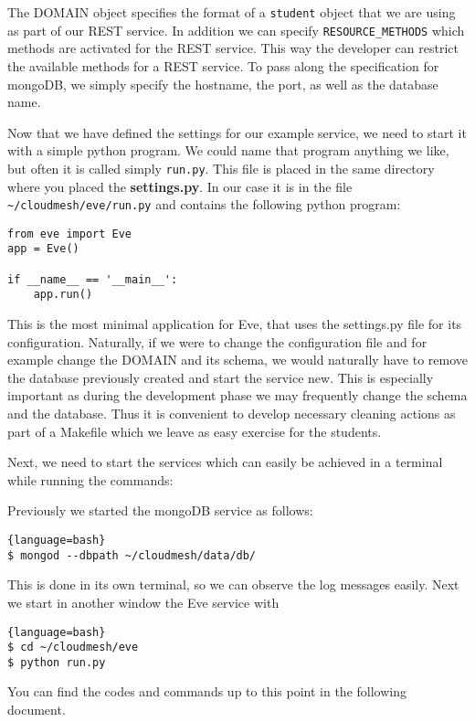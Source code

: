 The DOMAIN object specifies the format of a \verb|student| object that
we are using as part of our REST service.  In addition we can specify
\verb|RESOURCE_METHODS| which methods are activated for the REST
service. This way the developer can restrict the available methods for
a REST service. To pass along the specification for mongoDB, we simply
specify the hostname, the port, as well as the database name.

Now that we have defined the settings for our example service, we need
to start it with a simple python program. We could name that program
anything we like, but often it is called simply \verb|run.py|. This
file is placed in the same directory where you placed the
\textbf{settings.py}. In our case it is in the file
\verb|~/cloudmesh/eve/run.py| and contains the following python
program:

\begin{lstlisting}
from eve import Eve
app = Eve()

if __name__ == '__main__':
    app.run()
\end{lstlisting}

This is the most minimal application for Eve, that uses the
settings.py file for its configuration. Naturally, if we were to
change the configuration file and for example change the DOMAIN and
its schema, we would naturally have to remove the database previously
created and start the service new. This is especially important as
during the development phase we may frequently change the schema and
the database. Thus it is convenient to develop necessary cleaning
actions as part of a Makefile which we leave as easy exercise for the
students.

Next, we need to start the services which can easily be achieved in a
terminal while running the commands:

Previously we started the mongoDB service as follows:

\begin{lstlisting}{language=bash}
$ mongod --dbpath ~/cloudmesh/data/db/
\end{lstlisting}

This is done in its own terminal, so we can observe the log messages easily.
Next we start in another window the Eve service with 

\begin{lstlisting}{language=bash}
$ cd ~/cloudmesh/eve
$ python run.py
\end{lstlisting}

You can find the codes and commands up to this point in the following document.

